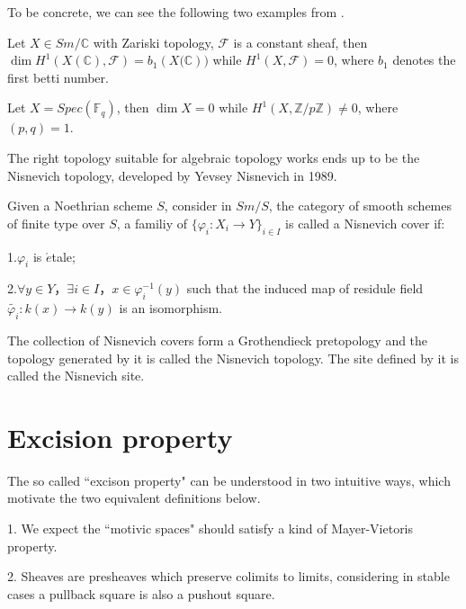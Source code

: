 To be concrete, we can see the following two examples from \textcite{Hlavinka2022}.

\begin{example}
    Let $X\in Sm/\mathbb{C}$ with Zariski topology, $\mathcal{F}$ is a constant sheaf, then $\dim H^1(X(\mathbb{C}),\mathcal{F})= b_1(X\mathbb(\mathbb{C}))$ while $H^1(X,\mathcal{F})=0$, where $b_1$ denotes the first betti number.
\end{example}


\begin{example}
    Let $X= Spec(\mathbb{F}_q)$, then $\dim X =0$ while $H^1(X,\mathbb{Z}/p\mathbb{Z})\neq 0$, where $(p,q)=1$.
\end{example}

The right topology suitable for algebraic topology works ends up to be the Nisnevich topology, developed by Yevsey Nisnevich in 1989\cite{Nisnevich1989}.

\begin{definition}
    Given a Noethrian scheme $S$, consider in $Sm/S$, the category of smooth schemes of finite type over $S$,  a familiy of $\{\varphi_i: X_i \to Y\}_{i\in I}$ is called a Nisnevich cover if:

    1.$\varphi_i$ is $\acute{e}$tale;

    2.$\forall y\in Y， \exists i \in I， x\in \varphi_i^{-1}(y)$ such that the induced map of residule field $\widetilde{\varphi_i}: k(x)\to k(y)$ is an isomorphism.

    The collection of Nisnevich covers form a Grothendieck pretopology and the topology generated by it is called the Nisnevich topology. The site defined by it is called the Nisnevich site.
\end{definition}

\section{Excision property}

The so called ``excison property" can be understood in two intuitive ways, which motivate the two equivalent definitions below.

1. We expect the ``motivic spaces" should satisfy a kind of Mayer-Vietoris property.

2. Sheaves are presheaves which preserve colimits to limits, considering in stable cases a pullback square is also a pushout square.

